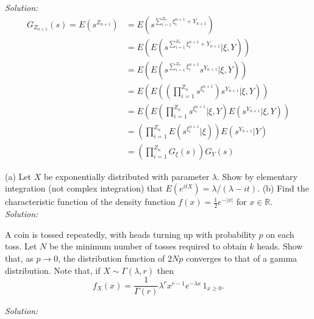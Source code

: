 \documentclass[10pt]{amsart}
\begin{document}
\noindent
\textit{Solution:}
\begin{align*}
G_{Z_{n+1}}(s) = E(s^{Z_{n+1}})
	&= E(s^{\sum_{i=1}^{Z_n} \xi^{n+1}_i + Y_{n+1}}) \\
	&= E( E(s^{\sum_{i=1}^{Z_n} \xi^{n+1}_i + Y_{n+1}}| \xi , Y)) \\
	&= E( E(s^{\sum_{i=1}^{Z_n} \xi^{n+1}_i}s^{Y_{n+1}}| \xi , Y)) \\
	&= E\left( E\left( \left( \prod_{i= 1}^{Z_n}s^{\xi^{n+1}_i} \right) s^{Y_{n+1}} \Bigg| \xi , Y\right)\right) \\
	&= E\left( E\left( \prod_{i= 1}^{Z_n} s^{\xi^{n+1}_i} \bigg| \xi , Y\right) E \left( s^{Y_{n+1}} \big| \xi , Y\right)\right) \\
	&= \left( \prod_{i= 1}^{Z_n} E\left( s^{\xi^{n+1}_i} \bigg| \xi \right) \right) E \left( s^{Y_{n+1}} \big| Y\right) \\
	&= \left( \prod_{i= 1}^{Z_n} G_{\xi}(s)  \right) G_{Y}(s)
\end{align*}

\newpage

 (a) Let $X$ be exponentially distributed with parameter $\lambda$. Show by elementary integration (not complex integration) that $E(e^{itX})=\lambda/(\lambda-i t)$.
(b) Find the characteristic function of the density function $f(x)=\frac{1}{2}e^{-|x|}$ for $x\in \mathds{R}$.
\\

\noindent
\textit{Solution:}

\newpage

 A coin is tossed repeatedly, with heads turning up with probability $p$ on each toss. Let $N$ be the minimum number of tosses required to obtain $k$ heads. Show that, as $p \to 0$, the distribution function of $2Np$ converges to that of a gamma distribution. Note that, if $X \sim \Gamma(\lambda, r )$ then
$$f_X(x) = \frac{1}{\Gamma(r)} \lambda^r x^{r-1} e^{-\lambda x} \, 1_{x \geq 0}.$$

\noindent
\textit{Solution:}
\end{document}

